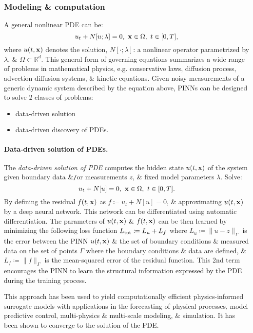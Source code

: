 \documentclass{article}
\begin{document}
\subsubsection{Modeling \& computation}
A general nonlinear PDE can be:
\begin{equation*}
	u_t + N[u;\lambda] = 0,\ {\bf x}\in\Omega,\ t\in[0,T],
\end{equation*}
where $u(t,{\bf x})$ denotes the solution, $N[\cdot;\lambda]$: a nonlinear operator parametrized by $\lambda$, \& $\Omega\subset\mathbb{R}^d$. This general form of governing equations summarizes a wide range of problems in mathematical physics, e.g. conservative laws, diffusion process, advection-diffusion systems, \& kinetic equations. Given noisy measurements of a generic dynamic system described by the equation above, PINNs can be designed to solve 2 classes of problems:
\begin{itemize}
	\item data-driven solution
	\item data-driven discovery of PDEs.
\end{itemize}

\paragraph{Data-driven solution of PDEs.} The {\it data-driven solution of PDE} computes the hidden state $u(t,{\bf x})$ of the system given boundary data \&{\tt/}or measurements $z$, \& fixed model parameters $\lambda$. Solve:
\begin{equation*}
	u_t + N[u] = 0,\ {\bf x}\in\Omega,\ t\in[0,T].
\end{equation*}
By defining the residual $f(t,{\bf x})$ as $f\coloneqq u_t + N[u] = 0$, \& approximating $u(t,{\bf x})$ by a deep neural network. This network can be differentiated using automatic differentiation. The parameters of $u(t,{\bf x})$ \& $f(t,{\bf x})$ can be then learned by minimizing the following loss function $L_{\rm tot}\coloneqq L_u + L_f$ where $L_u\coloneqq\|u - z\|_\Gamma$ is the error between the PINN $u(t,{\bf x})$ \& the set of boundary conditions \& measured data on the set of points $\Gamma$ where the boundary conditions \& data are defined, \& $L_f\coloneqq\|f\|_\Gamma$ is the mean-squared error of the residual function. This 2nd term encourages the PINN to learn the structural information expressed by the PDE during the training process.

This approach has been used to yield computationally efficient physics-informed surrogate models with applications in the forecasting of physical processes, model predictive control, multi-physics \& multi-scale modeling, \& simulation. It has been shown to converge to the solution of the PDE.
\end{document}
